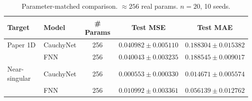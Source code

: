 \begin{table}[ht]\centering
\caption{Parameter-matched comparison. $\approx 256$ real params. $n=20$, 10 seeds.}
\label{tab:param_matched}
\begin{tabular}{llccc}
\toprule
Target & Model & \# Params & Test MSE & Test MAE \\
\midrule
Paper 1D & CauchyNet & 256 & $0.040982 \pm 0.005110$ & $0.188304 \pm 0.015382$ \\
 & FNN & 256 & $0.040043 \pm 0.003235$ & $0.188545 \pm 0.009017$ \\
\midrule
Near-singular & CauchyNet & 256 & $0.000553 \pm 0.000330$ & $0.014671 \pm 0.005574$ \\
 & FNN & 256 & $0.010992 \pm 0.003361$ & $0.056139 \pm 0.012762$ 
\bottomrule
\end{tabular}
\end{table}
